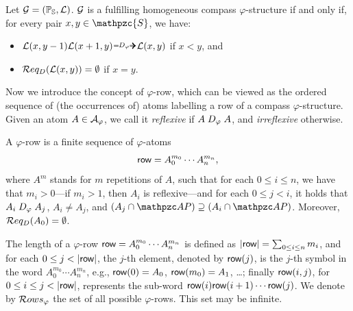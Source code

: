 \begin{lemma}\label{lem:compass_hom_gen}
Let $\mathcal{G}=(\mathbb{P}_{\mathbb{S}},\mathcal{L})$. $\mathcal{G}$ is a fulfilling homogeneous compass $\varphi$-structure if and only if, for every pair $x,y \in \mathpzc{S}$,  we have: 
\begin{itemize}
    \item $\cL(x,y-1)\cL(x+1, y)\genDphi \cL(x, y)$ if $x<y$, and 
    \item $\mathcal{R} eq_D(\mathcal{L}(x,y))=\emptyset$ if $x=y$.
\end{itemize}
\end{lemma}
%




Now we introduce the concept of $\varphi$-row, which can be viewed as the ordered sequence of (the occurrences of) atoms labelling a row of a compass $\varphi$-structure. Given an atom $A \in \mathcal{A}_{\varphi}$, we call it \emph{reflexive} if 
$A \mathrel{D_\varphi} A$, and \emph{irreflexive} otherwise.
%
\begin{definition}\label{def:row}
A $\varphi$-row is a finite sequence of $\varphi$-atoms \[\text{{\sffamily row}}=A_0^{m_0}\cdots A_n^{m_n},\] where $A^m$ stands for $m$ repetitions of $A$, such that for each $0\leq i \leq n$, we have that $m_i>0$---if $m_i>1$, then $A_i$ is reflexive---and for each $0\leq j<i$, it holds that $A_i \mathrel{D_\varphi} A_j$,  $A_i \neq A_j$, and $(A_j\cap \AP)\supseteq (A_i\cap \AP)$. Moreover, $\mathcal{R} eq_D(A_0)=\emptyset$.
\end{definition}

The length of a $\varphi$-row $\text{{\sffamily row}}=A_0^{m_0} \cdots A_n^{m_n}$ is defined as $|\text{{\sffamily row}}|=\sum_{0\leq i \leq n} m_i$, and for each $0\leq j<|\row|$, the $j$-th element, denoted by $\text{{\sffamily row}}(j)$, is the $j$-th symbol in the word $A_0^{m_0} \cdots A_n^{m_n}$, e.g., $\text{{\sffamily row}}(0)=A_0$, $\text{{\sffamily row}}(m_0)=A_1$, \dots; finally
$\text{{\sffamily row}}(i, j)$, for  $0\leq i \leq j < |\text{{\sffamily row}}|$, represents the sub-word $\text{{\sffamily row}}(i)\text{{\sffamily row}}(i+1)\cdots \text{{\sffamily row}}(j)$.
We denote by $\mathcal{R} ows_{\varphi}$ the set of all possible $\varphi$-rows. This set may be infinite.

